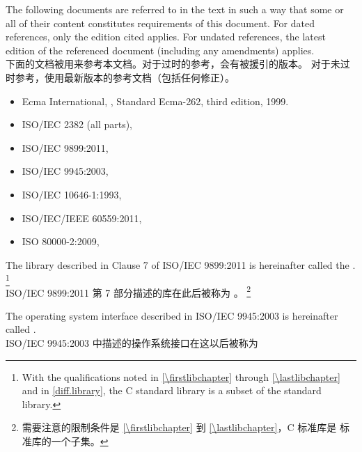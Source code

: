 \pnum
{}%
The following documents are referred to in the text
in such a way that some or all of their content
constitutes requirements
of this document. For dated references, only the edition cited applies.
For undated references, the latest edition of the referenced document
(including any amendments) applies.\\
下面的文档被用来参考本文档。对于过时的参考，会有被援引的版本。
对于未过时参考，使用最新版本的参考文档（包括任何修正）。
\begin{itemize}
\item Ecma International, ,
Standard Ecma-262, third edition, 1999.
\item ISO/IEC 2382 (all parts), 
\item ISO/IEC 9899:2011, 
\item ISO/IEC 9945:2003, 
\item ISO/IEC 10646-1:1993, 
\item ISO/IEC/IEEE 60559:2011, 
\item ISO 80000-2:2009, 
\end{itemize}

\pnum
The library described in Clause 7 of ISO/IEC 9899:2011
is hereinafter called the
.%
\footnote{With the qualifications noted in \ref{\firstlibchapter}
through \ref{\lastlibchapter} and in \ref{diff.library}, the C standard
library is a subset of the \Cpp{} standard library.} \\
ISO/IEC 9899:2011 第 7 部分描述的库在此后被称为
。%
\footnote{需要注意的限制条件是 \ref{\firstlibchapter} 到 \ref{\lastlibchapter}，C 
标准库是 \Cpp{} 标准库的一个子集。}

\pnum
The operating system interface described in ISO/IEC 9945:2003 is
hereinafter called . \\
ISO/IEC 9945:2003 中描述的操作系统接口在这以后被称为 

